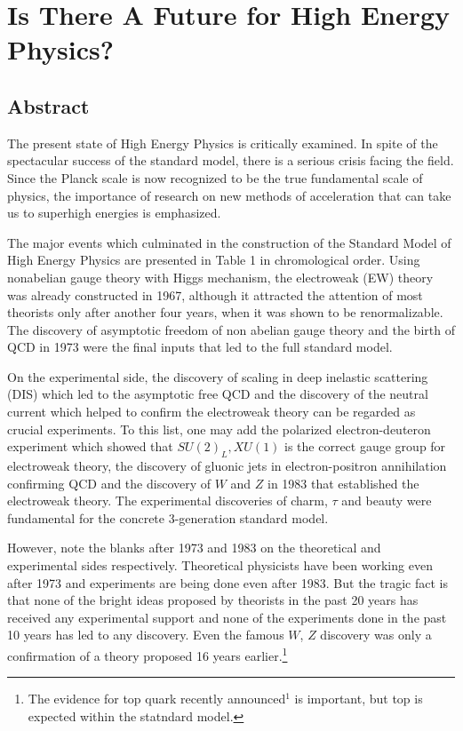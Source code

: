\chapter[Is There A Future for High Energy Physics?]{Is There A Future for High Energy Physics?}\label{chap11}



\section*{Abstract}

The present state of High Energy Physics is critically examined.
In spite of the spectacular success of the standard model, there is a serious crisis facing the
field. Since the Planck scale is now recognized to be the true fundamental scale of
physics, the importance of research on new methods of acceleration that can take
us to superhigh energies is emphasized.

The major events which culminated in the construction of the Standard Model of High
Energy Physics are presented in Table 1 in chromological order. Using nonabelian gauge
theory with Higgs mechanism, the electroweak (EW) theory was already constructed in
1967, although it attracted the attention of most theorists only after another four years,
when it was shown to be renormalizable. The discovery of asymptotic freedom of non
abelian gauge theory and the birth of QCD in 1973 were the final inputs that led to the
full standard model.


On the experimental side, the discovery of scaling in deep inelastic scattering (DIS)
which led to the asymptotic free QCD and the discovery of the neutral current which
helped to confirm the electroweak theory can be regarded as crucial experiments. To
this list, one may add the polarized electron-deuteron experiment which showed that
$SU(2)_{L},	XU(1)$ is the correct gauge group for electroweak theory, the discovery of gluonic
jets in electron-positron annihilation confirming QCD and the discovery of $W$ and $Z$ in
1983 that established the electroweak theory. The experimental discoveries of charm, $\tau$
and beauty were fundamental for the concrete 3-generation standard model.


However, note the blanks after 1973 and 1983 on the theoretical and experimental sides
respectively. Theoretical physicists have been working even after 1973 and experiments
are being done even after 1983. But the tragic fact is that none of the bright ideas
proposed by theorists in the past 20 years has received any experimental support and
none of the experiments done in the past 10 years has led to any discovery. Even the
famous $W$, $Z$ discovery was only a confirmation of a theory proposed 16 years earlier.\footnote{The evidence for top quark recently announced$^{1}$ is important, but top is expected within the statndard model.}

